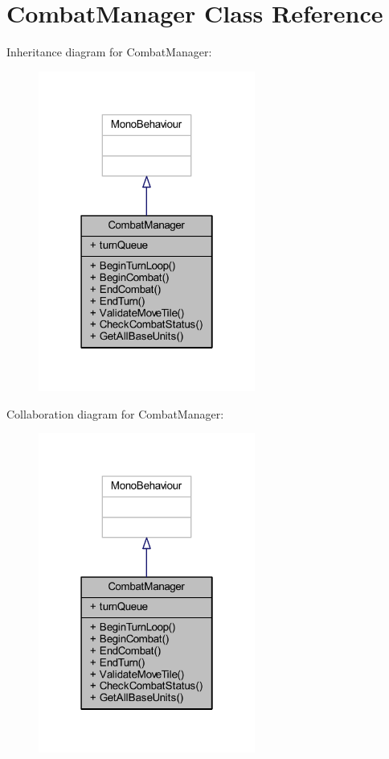 \hypertarget{class_combat_manager}{}\section{Combat\+Manager Class Reference}
\label{class_combat_manager}


Inheritance diagram for Combat\+Manager\+:
\nopagebreak
\begin{figure}[H]
\begin{center}
\leavevmode
\includegraphics[width=202pt]{class_combat_manager__inherit__graph}
\end{center}
\end{figure}


Collaboration diagram for Combat\+Manager\+:
\nopagebreak
\begin{figure}[H]
\begin{center}
\leavevmode
\includegraphics[width=202pt]{class_combat_manager__coll__graph}
\end{center}
\end{figure}
